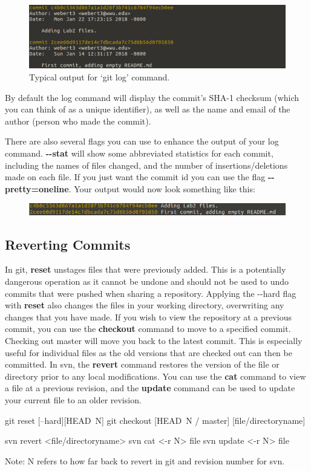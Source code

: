 \documentclass[oneside]{book}
\begin{document}
\begin{figure}[ht!]
    \centering
	\includegraphics[width=120mm]{git_log_example.png}
	\caption{Typical output for `git log' command.} 
\end{figure}

By default the log command will display the commit's SHA-1 checksum (which you can think of as a unique identifier), as well as the name and email of the author (person who made the commit).

There are also several flags you can use to enhance the output of your log command. \textbf{-{}-stat} will show some abbreviated statistics for each commit, including the names of files changed, and the number of insertions/deletions made on each file. If you just want the commit id you can use the flag \textbf{-{}-pretty=oneline}. Your output would now look something like this:

\begin{figure}[ht!]
    \centering
	\includegraphics[width=120mm]{oneline.png}
\end{figure}

\subsection{Reverting Commits}
In git, \textbf{reset} unstages files that were previously added. This is a potentially dangerous operation as it cannot be undone and should not be used to undo commits that were pushed when sharing a repository. Applying the -{}-hard flag with  \textbf{reset} also changes the files in your working directory, overwriting any changes that you have made. If you wish to view the repository at a previous commit, you can use the \textbf{checkout} command to move to a specified commit. Checking out master will move you back to the latest commit. This is especially useful for individual files as the old versions that are checked out can then be committed. In svn, the \textbf{revert} command restores the version of the file or directory prior to any local modifications. You can use the \textbf{cat} command to view a file at a previous revision, and the \textbf{update} command can be used to update your current file to an older revision. 
    \begin{gitcode}
    git reset [--hard][HEAD~N]
    git checkout [HEAD~N / master] [file/directoryname] 
    \end{gitcode}
    \begin{svncode} 
    svn revert <file/directoryname>
    svn cat <-r N> file
    svn update <-r N> file
    \end{svncode}
Note: N refers to how far back to revert in git and revision number for svn.
\end{document}
